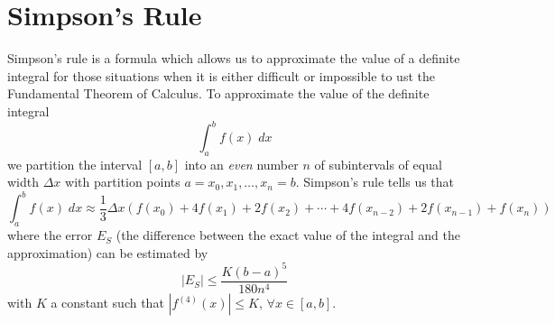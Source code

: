 \documentclass[12pt,letterpaper,fleqn]{article}
\begin{document}
\section*{Simpson's Rule}
Simpson's rule is a formula which allows us to approximate the value of a definite integral for those situations when it is either difficult or impossible to ust the Fundamental Theorem of Calculus. To approximate the value of the definite integral
\begin{equation*}
	\int_a^b f(x)\;dx
\end{equation*}
we partition the interval $[a, b]$ into an \emph{even} number $n$ of subintervals of equal width $\Delta x$ with partition points $a=x_0, x_1,\ldots,x_n=b$. Simpson's rule tells us that
\begin{equation*}
	\int_a^b f(x)\;dx \approx \frac{1}{3}\Delta x\left(f(x_0) + 4f(x_1) + 2f(x_2) + \cdots + 4f(x_{n-2}) + 2f(x_{n-1}) + f(x_n)\right)
\end{equation*}
where the error $E_S$ (the difference between the exact value of the integral and the approximation) can be estimated by
\begin{equation*}
	|E_S| \leq \frac{K (b-a)^5}{180n^4}
\end{equation*}
with $K$ a constant such that $\left|f^{(4)}(x)\right| \leq K$, $\forall x\in [a,b]$.
\end{document}
